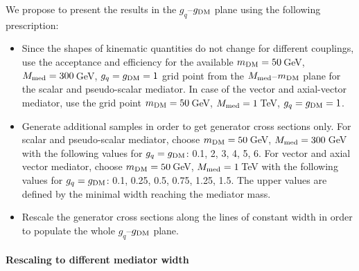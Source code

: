We propose to present the results in the $g_q$--$g_{\rm{DM}}$ plane using the following prescription:
\begin{itemize}
\item Since the shapes of kinematic quantities do not change for different couplings, use the acceptance and efficiency for the available $m_{\rm{DM}}=50$\,GeV, $M_{\rm{med}}=300$\,GeV, $g_q=g_{\rm{DM}}=1$ grid point from the $M_{\rm{med}}$--$m_{\rm{DM}}$ plane for the scalar and pseudo-scalar mediator. In case of the vector and axial-vector mediator, use the grid point $m_{\rm{DM}}=50$\,GeV, $M_{\rm{med}}=1$\,TeV, $g_q=g_{\rm{DM}}=1$.
\item Generate additional samples in order to get generator cross sections only. For scalar and pseudo-scalar mediator, choose $m_{\rm{DM}}=50$\,GeV, $M_{\rm{med}}=300$\,GeV with the following values for $g_q=g_{\rm{DM}}$: 0.1, 2, 3, 4, 5, 6. For vector and axial vector mediator, choose $m_{\rm{DM}}=50$\,GeV, $M_{\rm{med}}=1$\,TeV with the following values for $g_q=g_{\rm{DM}}$: 0.1, 0.25, 0.5, 0.75, 1.25, 1.5. The upper values are defined by the minimal width reaching the mediator mass.
\item Rescale the generator cross sections along the lines of constant width in order to populate the whole $g_q$--$g_{\rm{DM}}$ plane.
\end{itemize}



\paragraph{Rescaling to different mediator width}

